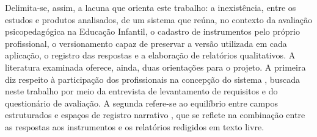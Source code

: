 Delimita-se, assim, a lacuna que orienta este trabalho: a inexistência, entre os estudos e produtos analisados, de um sistema que reúna, no contexto da avaliação psicopedagógica na Educação Infantil, o cadastro de instrumentos pelo próprio profissional, o versionamento capaz de preservar a versão utilizada em cada aplicação, o registro das respostas e a elaboração de relatórios qualitativos. A literatura examinada oferece, ainda, duas orientações para o projeto. A primeira diz respeito à participação dos profissionais na concepção do sistema \cite{zurynski2021_emr_saude_mental}, buscada neste trabalho por meio da entrevista de levantamento de requisitos e do questionário de avaliação. A segunda refere-se ao equilíbrio entre campos estruturados e espaços de registro narrativo \cite{kariotis2022_ehr_saude_mental}, que se reflete na combinação entre as respostas aos instrumentos e os relatórios redigidos em texto livre.